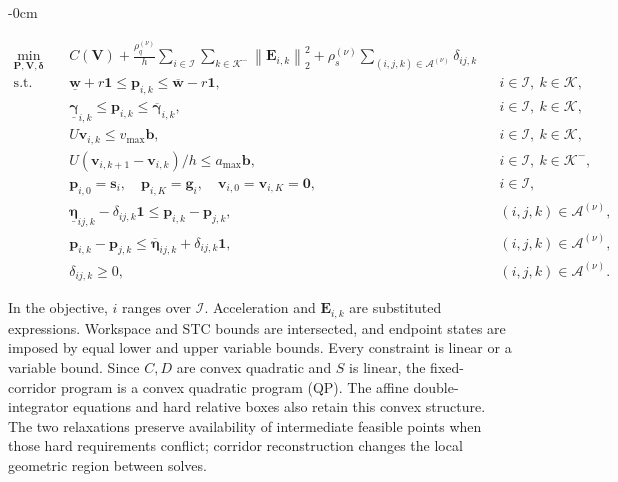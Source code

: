 \documentclass[electronics,article,submit,moreauthors]{Definitions/mdpi}
\newcommand{\norm}[1]{\left\lVert #1\right\rVert}
\newcommand{\bp}{\mathbf{p}}
\newcommand{\bv}{\mathbf{v}}
\newcommand{\one}{\mathbf{1}}
\providecommand{\DIFaddbegin}{}\providecommand{\DIFaddend}{} %
\begin{document}
\begin{adjustwidth}{-\extralength}{0cm}
\DIFdelend \DIFaddbegin 
\begin{mdframed}[nobreak=true,linecolor=RevisionBlue,linewidth=.65pt,innerleftmargin=5pt,innerrightmargin=5pt,innertopmargin=2pt,innerbottommargin=2pt,skipabove=6pt,skipbelow=6pt]
\color{RevisionBlue}
\begin{subequations}\label{eq:subproblem}\begin{align}
 \min_{\mathbf P,\mathbf V,\boldsymbol\delta}\quad&
 C(\mathbf V)
 +\frac{\rho_q^{(\nu)}}h\sum_{i\in\mathcal I}\sum_{k\in\mathcal K^-}\norm{\mathbf E_{i,k}}_2^2
 +\rho_s^{(\nu)}\sum_{(i,j,k)\in\mathcal A^{(\nu)}}\delta_{ij,k}
 \label{eq:nlpobjective}\\
 \mathrm{s.t.}\quad&
 \underline{\mathbf w}+r\one\leq\bp_{i,k}\leq\overline{\mathbf w}-r\one,
 && i\in\mathcal I,\ k\in\mathcal K,\label{eq:nlpworkspace}\\
 &\underline{\boldsymbol\gamma}_{i,k}\leq\bp_{i,k}\leq\overline{\boldsymbol\gamma}_{i,k},
 &&i\in\mathcal I,\ k\in\mathcal K,\label{eq:nlpstc}\\
 &U\bv_{i,k}\leq v_{\max}\mathbf b,
 &&i\in\mathcal I,\ k\in\mathcal K,\label{eq:nlpvelocity}\\
 &U(\bv_{i,k+1}-\bv_{i,k})/h\leq a_{\max}\mathbf b,
 &&i\in\mathcal I,\ k\in\mathcal K^-,\label{eq:nlpacceleration}\\
 &\bp_{i,0}=\mathbf s_i,\quad\bp_{i,K}=\mathbf g_i,\quad
 \bv_{i,0}=\bv_{i,K}=\mathbf0,
 &&i\in\mathcal I,\label{eq:nlpboundary}\\
 &\underline{\boldsymbol\eta}_{ij,k}-\delta_{ij,k}\one
 \leq\bp_{i,k}-\bp_{j,k},
 &&(i,j,k)\in\mathcal A^{(\nu)},\label{eq:nlprellower}\\
 &\bp_{i,k}-\bp_{j,k}\leq\overline{\boldsymbol\eta}_{ij,k}+\delta_{ij,k}\one,
 &&(i,j,k)\in\mathcal A^{(\nu)},\label{eq:nlprelupper}\\
 &\delta_{ij,k}\geq0,
 &&(i,j,k)\in\mathcal A^{(\nu)}.\label{eq:nlpslack}
\end{align}\end{subequations}
\end{mdframed}

\DIFaddend 

\end{adjustwidth}
In the objective, $i$ ranges over $\mathcal I$. Acceleration and $\mathbf E_{i,k}$ are substituted expressions. Workspace and STC bounds are intersected, and endpoint states are imposed by equal lower and upper variable bounds. Every constraint is linear or a variable bound. Since $C,D$ are convex quadratic and $S$ is linear, the fixed-corridor program is a convex quadratic program (QP). The affine double-integrator equations and hard relative boxes also retain this convex structure. The two relaxations preserve availability of intermediate feasible points when those hard requirements conflict; corridor reconstruction changes the local geometric region between solves.
\end{document}
